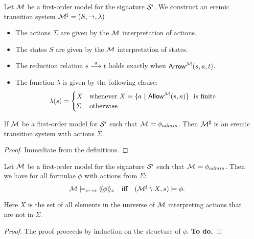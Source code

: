 \begin{definition}
Let $\mathcal{M}$ be a first-order model for the signature $\mathcal{S}'$.
We construct an eremic transition system
$\mathcal{M}^{\sharp} = (S, \rightarrow, \lambda)$.
\begin{itemize}

\item The actions $\Sigma$ are given by the $\mathcal{M}$ interpretation of actions.

\item The states $S$ are given by the $\mathcal{M}$ interpretation of states.

\item The reduction relation $s \stackrel{a}{\longrightarrow} t$ holds exactly when
  $\mathsf{Arrow}^{\mathcal{M}}(s, a, t)$.

\item The function $\lambda$ is given by the following clause:
  \[
     \lambda(s) 
        =
     \begin{cases} 
       X & \text{whenever}\ X = \{a \ |\ \ALLOWED{\CAL{M}}{s}{a} \}\ \text{ is finite} \\
       \Sigma & \text{otherwise}
     \end{cases}
  \]

\end{itemize}

\end{definition}

\begin{lemma}
If $\mathcal{M}$ be a first-order model for $\mathcal{S}'$ such that $\mathcal{M}
\models \phi_{admis}$.  Then $\mathcal{M}^{\sharp}$ is an eremic
transition system with actions $\Sigma$.
\end{lemma}
\begin{proof}
Immediate from the definitions.

\end{proof}

\begin{theorem}\label{correspondence:theorem:223}
Let $\mathcal{M}$ be a first-order model for the signature $\mathcal{S}'$ such that
 $\mathcal{M} \models \phi_{admis}$.
Then we have for all \ELABR{} formulae $\phi$ with
actions from $\Sigma$:
\[
   \mathcal{M} \models_{x \mapsto s} \langle\!\langle \phi \rangle\!\rangle_x 
        \quad  \text{iff} \quad 
   (\mathcal{M}^{\sharp} \setminus X, s) \models \phi.
\]
\end{theorem}
Here $X$ is the set of all elements in the universe of $\mathcal{M}$ interpreting
actions that are not in $\Sigma$.
\begin{proof}
The proof proceeds by induction on the structure of $\phi$. \textbf{To do.}
\end{proof}

